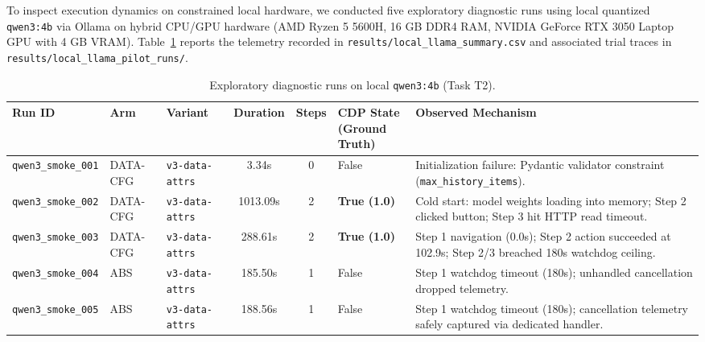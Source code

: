 \documentclass[11pt,a4paper]{article}
\begin{document}
To inspect execution dynamics on constrained local hardware, we conducted five exploratory diagnostic runs using local quantized \texttt{qwen3:4b} via Ollama on hybrid CPU/GPU hardware (AMD Ryzen 5 5600H, 16 GB DDR4 RAM, NVIDIA GeForce RTX 3050 Laptop GPU with 4 GB VRAM). Table~\ref{tab:qwen_runs} reports the telemetry recorded in \texttt{results/local\_llama\_summary.csv} and associated trial traces in \texttt{results/local\_llama\_pilot\_runs/}.

\begin{table}[t]
\centering
\small
\setlength{\tabcolsep}{4pt}
\caption{Exploratory diagnostic runs on local \texttt{qwen3:4b} (Task T2).}
\label{tab:qwen_runs}
\begin{tabularx}{\textwidth}{>{\raggedright\arraybackslash}p{2.6cm} >{\raggedright\arraybackslash}p{1.8cm} >{\raggedright\arraybackslash}p{2.1cm} cc >{\centering\arraybackslash}p{2.0cm} >{\raggedright\arraybackslash}X}
\toprule
\textbf{Run ID} & \textbf{Arm} & \textbf{Variant} & \textbf{Duration} & \textbf{Steps} & \shortstack{\textbf{CDP State} \\ \scriptsize(Ground Truth)} & \textbf{Observed Mechanism} \\
\midrule
\texttt{qwen3\_smoke\_001} & \textsc{DATA-CFG} & \texttt{v3-data-attrs} & 3.34s    & 0 & False      & Initialization failure: Pydantic validator constraint (\texttt{max\_history\_items}). \\
\texttt{qwen3\_smoke\_002} & \textsc{DATA-CFG} & \texttt{v3-data-attrs} & 1013.09s & 2 & \textbf{True (1.0)} & Cold start: model weights loading into memory; Step 2 clicked button; Step 3 hit HTTP read timeout. \\
\texttt{qwen3\_smoke\_003} & \textsc{DATA-CFG} & \texttt{v3-data-attrs} & 288.61s  & 2 & \textbf{True (1.0)} & Step 1 navigation (0.0s); Step 2 action succeeded at 102.9s; Step 2/3 breached 180s watchdog ceiling. \\
\texttt{qwen3\_smoke\_004} & \textsc{ABS}      & \texttt{v3-data-attrs} & 185.50s  & 1 & False      & Step 1 watchdog timeout (180s); unhandled cancellation dropped telemetry. \\
\texttt{qwen3\_smoke\_005} & \textsc{ABS}      & \texttt{v3-data-attrs} & 188.56s  & 1 & False      & Step 1 watchdog timeout (180s); cancellation telemetry safely captured via dedicated handler. \\
\bottomrule
\end{tabularx}
\end{table}
\end{document}
